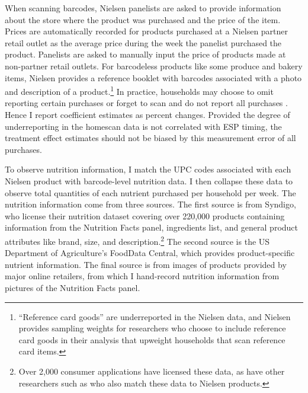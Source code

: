 \documentclass[12pt]{article}
\begin{document}
When scanning barcodes, Nielsen panelists are asked to provide information about the store where the product was purchased and the price of the item.
Prices are automatically recorded for products purchased at a Nielsen partner retail outlet as the average price during the week the panelist purchased the product.
Panelists are asked to manually input the price of products made at non-partner retail outlets.
For barcodeless products like some produce and bakery items, Nielsen provides a reference booklet with barcodes associated with a photo and description of a product.\footnote{``Reference card goods'' are underreported in the Nielsen data, and Nielsen provides sampling weights for researchers who choose to include reference card goods in their analysis that upweight households that scan reference card items.} In practice, households may choose to omit reporting certain purchases or forget to scan and do not report all purchases \parencite{einav2010recording}.
Hence I report coefficient estimates as percent changes.
Provided the degree of underreporting in the homescan data is not correlated with ESP timing, the treatment effect estimates should not be biased by this measurement error of all purchases.

To observe nutrition information, I match the UPC codes associated with each Nielsen product with barcode-level nutrition data.
I then collapse these data to observe total quantities of each nutrient purchased per household per week.
The nutrition information come from three sources.
The first source is from Syndigo, who license their nutrition dataset covering over 220,000 products containing information from the Nutrition Facts panel, ingredients list, and general product attributes like brand, size, and description.\footnote{Over 2,000 consumer applications have licensed these data, as have other researchers such as \textcite{dubois2014prices} who also match these data to Nielsen products.} The second source is the US Department of Agriculture's FoodData Central, which provides product-specific nutrient information.
The final source is from images of products provided by major online retailers, from which I hand-record nutrition information from pictures of the Nutrition Facts panel.
\end{document}

